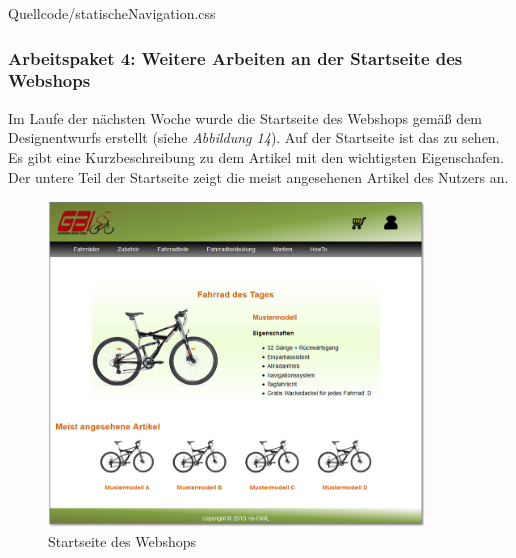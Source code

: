 \newpage
\begin{center}
	\begin{lstinputlisting}[language=CSS, caption={Auszug aus der CSS Datei - Die Seitennavigation}]
		{Quellcode/statischeNavigation.css}
	\end{lstinputlisting}
\end{center}



\subsubsection{Arbeitspaket 4: Weitere Arbeiten an der Startseite des Webshops}

Im Laufe der nächsten Woche wurde die Startseite des Webshops gemäß dem Designentwurfs erstellt (siehe \textit{Abbildung 14}). Auf der Startseite ist das \grqq{} zu sehen. Es gibt eine Kurzbeschreibung zu dem Artikel mit den wichtigsten Eigenschafen. Der untere Teil der Startseite zeigt die meist angesehenen Artikel des Nutzers an.

\begin{figure}[H]
\begin{center}

\includegraphics[width=10cm]{Bilder/Abbildung5-StartseiteDesWebshops.png}
\end{center}
\caption{Startseite des Webshops}
\end{figure}


